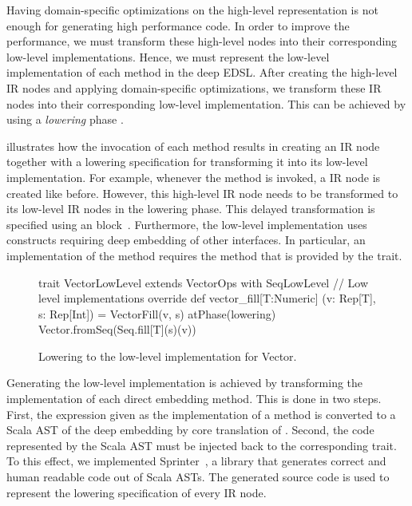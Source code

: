 Having domain-specific optimizations on the high-level representation is not
enough for generating high performance code. In order to improve the
performance, we must transform these high-level nodes into their corresponding
low-level implementations. Hence, we must represent the low-level
implementation of each method in the deep EDSL. After creating the high-level
IR nodes and applying domain-specific optimizations, we transform these IR
nodes into their corresponding low-level implementation. This can be achieved by
using a \emph{lowering} phase \cite{rompf_optimizing_2013}.

 illustrates how the invocation of each method
results in creating an IR node together with a lowering specification for
transforming it into its low-level implementation. For example, whenever the
method  is invoked, a  IR node is created like
before. However, this high-level IR node needs to be transformed to its low-level
IR nodes in the lowering phase. This delayed transformation is specified
using an  block~\cite{rompf_optimizing_2013}.
Furthermore, the low-level implementation uses constructs requiring deep
embedding of other interfaces. In particular, an implementation of the
 method requires the  method that is provided by
the  trait.
\begin{figure}[ht]
\begin{listingtiny}
trait VectorLowLevel extends VectorOps
  with SeqLowLevel {
  // Low level implementations
  override def vector_fill[T:Numeric]
    (v: Rep[T], s: Rep[Int]) =
    VectorFill(v, s) atPhase(lowering) {
      Vector.fromSeq(Seq.fill[T](s)(v))
    }
}
\end{listingtiny}
\caption{\label{lst:vector_deep_low} Lowering to the low-level implementation for Vector.}
\end{figure}


Generating the low-level implementation is achieved by transforming the
implementation of each direct embedding method. This is done in two steps.
First, the expression given as the implementation of a method is converted to
a Scala AST of the deep embedding by core translation of \yy. Second, the
code represented by the Scala AST must be injected back to the corresponding
trait. To this effect, we implemented Sprinter~\cite{sprinter}, a library that generates
correct and human readable code out of Scala ASTs. The generated source code
is used to represent the lowering specification of every IR node.


